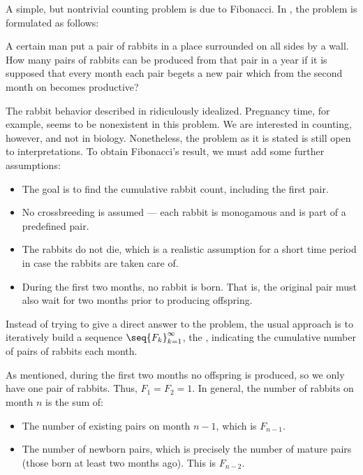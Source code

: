 \begin{example}\label{ex:fibonacci_rabbits}
  A simple, but nontrivial counting problem is due to Fibonacci. In \cite{MacTutor:fibonacci}, the problem is formulated as follows:
  \begin{displayquote}
    A certain man put a pair of rabbits in a place surrounded on all sides by a wall. How many pairs of rabbits can be produced from that pair in a year if it is supposed that every month each pair begets a new pair which from the second month on becomes productive?
  \end{displayquote}

  The rabbit behavior described in ridiculously idealized. Pregnancy time, for example, seems to be nonexistent in this problem. We are interested in counting, however, and not in biology. Nonetheless, the problem as it is stated is still open to interpretations. To obtain Fibonacci's result, we must add some further assumptions:
  \begin{itemize}
    \item The goal is to find the cumulative rabbit count, including the first pair.
    \item No crossbreeding is assumed --- each rabbit is monogamous and is part of a predefined pair.
    \item The rabbits do not die, which is a realistic assumption for a short time period in case the rabbits are taken care of.
    \item During the first two months, no rabbit is born. That is, the original pair must also wait for two months prior to producing offspring.
  \end{itemize}

  Instead of trying to give a direct answer to the problem, the usual approach is to iteratively build a sequence \( \seq{ F_k }_{k=1}^\infty \), the , indicating the cumulative number of pairs of rabbits each month.

  As mentioned, during the first two months no offspring is produced, so we only have one pair of rabbits. Thus, \( F_1 = F_2 = 1 \). In general, the number of rabbits on month \( n \) is the sum of:
  \begin{itemize}
    \item The number of existing pairs on month \( n - 1 \), which is \( F_{n - 1} \).
    \item The number of newborn pairs, which is precisely the number of mature pairs (those born at least two months ago). This is \( F_{n - 2} \).
  \end{itemize}


\end{example}
